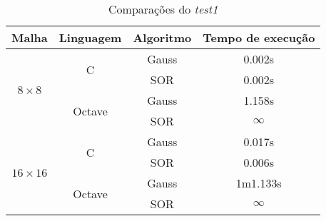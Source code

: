 \documentclass[
	11pt,				%
	oneside,			%
	a4paper,			%
	english,			%
	brazil,				%
	]{article}
\begin{document}
\begin{table}[ht]
\centering
\begin{tabular}{cccc}
\hline 
\textbf{Malha} & \textbf{Linguagem} & \textbf{Algoritmo} & \textbf{Tempo de execução} \\
\hline
\multirow{4}{*}{\textit{$8 \times 8$}} & \multirow{2}{*}{C}  & Gauss & 0.002s  \\ 
& & SOR & 0.002s  \\
& \multirow{2}{*}{Octave} & Gauss & 1.158s  \\
& & SOR & $\infty$ \\
\hline
\multirow{4}{*}{\textit{$16 \times 16$}} & \multirow{2}{*}{C} & Gauss & 0.017s  \\ 
& & SOR & 0.006s  \\
& \multirow{2}{*}{Octave} & Gauss & 1m1.133s  \\
& & SOR & $\infty$ \\
\hline
\end{tabular}
\caption{Comparações do \textit{test1}}
\label{tab:cmp1}
\end{table}
\end{document}
